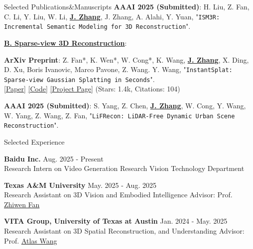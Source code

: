 \documentclass{resume} %
\begin{document}
\begin{rSection}{Selected Publications\&Manuscripts}
{ {\bf AAAI 2025 (Submitted)}}:
H. Liu, Z. Fan, C. Li, Y. Liu, W. Li, \underline{\textbf{J. Zhang}}, J. Zhang, A. Alahi, Y. Yuan,
 "{\texttt{ISM3R: Incremental Semantic Modeling for 3D Reconstruction}}".
\vspace{-1mm}

\textbf{\underline{B. Sparse-view 3D Reconstruction}}:

{ {\bf ArXiv Preprint}}:
Z. Fan*, K. Wen*, W. Cong*, K. Wang, \underline{\textbf{J. Zhang}}, X. Ding, 
D. Xu, Boris Ivanovic, Marco Pavone, Z. Wang. Y. Wang,
 "{\texttt{InstantSplat: Sparse-view Gaussian Splatting in Seconds}}".
\\ \hspace{1em} {\color{BlueViolet} \href{https://arxiv.org/abs/2403.20309}{[\underline{Paper}]} \hspace{1em} \href{https://github.com/NVlabs/InstantSplat}{[\underline{Code}]} \hspace{1em} \href{https://instantsplat.github.io/}{[\underline{Project Page}]}} \hspace{1em} (Stars: 1.4k, Citations: 104)
\vspace{-1mm}

{ {\bf AAAI 2025 (Submitted)}}:
S. Yang, Z. Chen, \underline{\textbf{J. Zhang}}, W. Cong, Y. Wang, W. Yang, Z. Wang, Z. Fan,
 "{\texttt{LiFRecon: LiDAR-Free Dynamic Urban Scene Reconstruction}}".
\vspace{-1mm}
 
\vspace{-1mm}
\end{rSection}

\begin{rSection}{Selected Experience}

\vspace{-0mm}
{ {\bf Baidu Inc.}} \hfill  Aug. 2025 - Present
\\Research Intern on Video Generation Research \hfill Vision Technology Department

\vspace{-0.5mm}

{ {\bf Texas A\&M University}} \hfill  May. 2025 - Aug. 2025
\\Research Assistant on 3D Vision and Embodied Intelligence \hfill Advisor: Prof. {\color{BlueViolet} \href{https://zhiwenfan.github.io/}{Zhiwen Fan}}

\vspace{-0.5mm}

{ {\bf VITA Group, University of Texas at Austin}} \hfill  Jan. 2024 - May. 2025
\\Research Assistant on 3D Spatial Reconstruction, and Understanding \hfill Advisor: Prof. {\color{BlueViolet} \href{https://vita-group.github.io/group.html}{Atlas Wang}}

\end{rSection}
\end{document}
